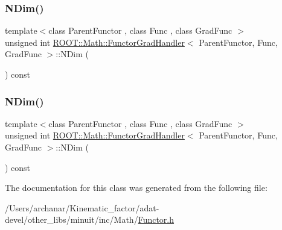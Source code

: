 \subsubsection{\texorpdfstring{NDim()}{NDim()}\hspace{0.1cm}{\footnotesize\ttfamily [2/3]}}
{\footnotesize\ttfamily template$<$class Parent\+Functor , class Func , class Grad\+Func $>$ \\
unsigned int \mbox{\hyperlink{classROOT_1_1Math_1_1FunctorGradHandler}{R\+O\+O\+T\+::\+Math\+::\+Functor\+Grad\+Handler}}$<$ Parent\+Functor, Func, Grad\+Func $>$\+::N\+Dim (\begin{DoxyParamCaption}{ }\end{DoxyParamCaption}) const\hspace{0.3cm}{\ttfamily [inline]}}

\mbox{\label{classROOT_1_1Math_1_1FunctorGradHandler_a9fd1149654daac8b76a15f877663ff82}} 
\subsubsection{\texorpdfstring{NDim()}{NDim()}\hspace{0.1cm}{\footnotesize\ttfamily [3/3]}}
{\footnotesize\ttfamily template$<$class Parent\+Functor , class Func , class Grad\+Func $>$ \\
unsigned int \mbox{\hyperlink{classROOT_1_1Math_1_1FunctorGradHandler}{R\+O\+O\+T\+::\+Math\+::\+Functor\+Grad\+Handler}}$<$ Parent\+Functor, Func, Grad\+Func $>$\+::N\+Dim (\begin{DoxyParamCaption}{ }\end{DoxyParamCaption}) const\hspace{0.3cm}{\ttfamily [inline]}}



The documentation for this class was generated from the following file\+:\begin{DoxyCompactItemize}
\item 
/\+Users/archanar/\+Kinematic\+\_\+factor/adat-\/devel/other\+\_\+libs/minuit/inc/\+Math/\mbox{\hyperlink{adat-devel_2other__libs_2minuit_2inc_2Math_2Functor_8h}{Functor.\+h}}\end{DoxyCompactItemize}
